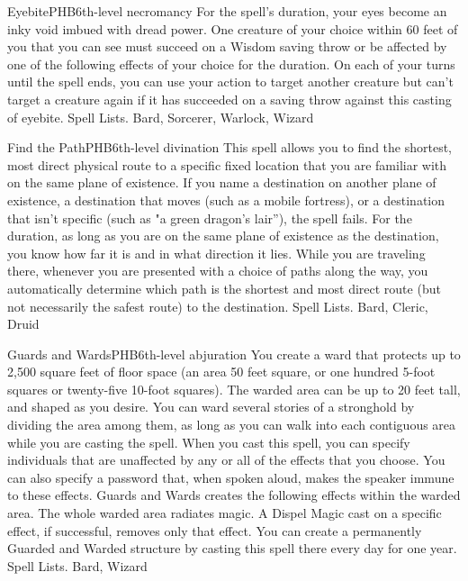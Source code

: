 \begin{spell}{Eyebite}{PHB}{6th-level necromancy}
{
}
For the spell’s duration, your eyes become an inky void imbued with dread power. One creature of your choice within 60 feet of you that you can see must succeed on a Wisdom saving throw or be affected by one of the following effects of your choice for the duration. On each of your turns until the spell ends, you can use your action to target another creature but can’t target a creature again if it has succeeded on a saving throw against this casting of eyebite.
Spell Lists. Bard, Sorcerer, Warlock, Wizard
\end{spell}

\begin{spell}{Find the Path}{PHB}{6th-level divination}
{
}
This spell allows you to find the shortest, most direct physical route to a specific fixed location that you are familiar with on the same plane of existence. If you name a destination on another plane of existence, a destination that moves (such as a mobile fortress), or a destination that isn’t specific (such as "a green dragon’s lair”), the spell fails.
For the duration, as long as you are on the same plane of existence as the destination, you know how far it is and in what direction it lies. While you are traveling there, whenever you are presented with a choice of paths along the way, you automatically determine which path is the shortest and most direct route (but not necessarily the safest route) to the destination.
Spell Lists. Bard, Cleric, Druid
\end{spell}

\begin{spell}{Guards and Wards}{PHB}{6th-level abjuration}
{
}
You create a ward that protects up to 2,500 square feet of floor space (an area 50 feet square, or one hundred 5-foot squares or twenty-five 10-foot squares). The warded area can be up to 20 feet tall, and shaped as you desire. You can ward several stories of a stronghold by dividing the area among them, as long as you can walk into each contiguous area while you are casting the spell.
When you cast this spell, you can specify individuals that are unaffected by any or all of the effects that you choose. You can also specify a password that, when spoken aloud, makes the speaker immune to these effects.
Guards and Wards creates the following effects within the warded area.
The whole warded area radiates magic. A Dispel Magic cast on a specific effect, if successful, removes only that effect. You can create a permanently Guarded and Warded structure by casting this spell there every day for one year.
Spell Lists. Bard, Wizard
\end{spell}

